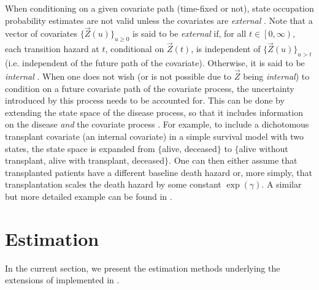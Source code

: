 When conditioning on a given covariate path (time-fixed or not), state occupation probability estimates are not valid unless the covariates are \textit{external} \citep[][p. 142]{Cortese2010,Aalen2008}. 
Note that a vector of covariates $\lbrace \vec{Z}(u)\rbrace_{u\geq 0}$ is said to be \textit{external} if, for all $t \in \left[0,\infty\right)$, each transition hazard at $t$, conditional on $ \vec{Z}(t)$, is independent of $\lbrace \vec{Z}(u)\rbrace_{u>t}$ (i.e.  independent of the future path of the covariate). Otherwise, it is said to be \textit{internal} \citep[for more details on the distinction between internal and external covariates, see][chapter 6]{Kalbfleisch2002}.
When one does not wish (or is not possible due to $\vec{Z}$ being \textit{internal}) to condition on a future  covariate path of the covariate process, the uncertainty introduced by  this process needs to be accounted for.  This can be done by extending the state space of the disease process, so that it includes information on the disease \textit{and} the covariate process \citep[][p. 170]{Andersen1993}.  For example, to include a dichotomous transplant covariate (an internal covariate) in a simple survival model with two states, the state space is expanded from $\lbrace$alive,  deceased$\rbrace$ to $\lbrace$alive without transplant, alive with transplant,  deceased$\rbrace$. One can then either assume that transplanted patients have a different baseline death hazard or, more simply,  that transplantation scales the death hazard by some constant $\exp \left( \gamma\right)$.  A similar but more detailed example can be found in \citet[][section 2.3.2, `model 3' ]{Wreede2010}. 

\section{Estimation}
In the current section,  we present the estimation methods underlying the extensions of  implemented in .  
 \label{sec:estimation}


